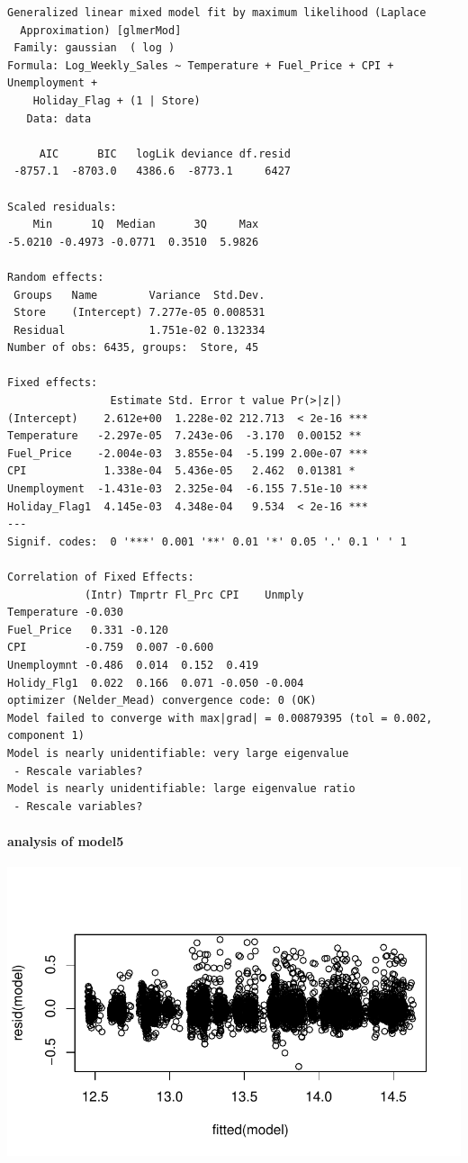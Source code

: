 \documentclass[
  letterpaper,
  DIV=11,
  numbers=noendperiod]{scrartcl}
\let\oldparagraph\paragraph
\renewcommand{\paragraph}[1]{\oldparagraph{#1}\mbox{}}
\begin{document}
\begin{verbatim}
Generalized linear mixed model fit by maximum likelihood (Laplace
  Approximation) [glmerMod]
 Family: gaussian  ( log )
Formula: Log_Weekly_Sales ~ Temperature + Fuel_Price + CPI + Unemployment +  
    Holiday_Flag + (1 | Store)
   Data: data

     AIC      BIC   logLik deviance df.resid 
 -8757.1  -8703.0   4386.6  -8773.1     6427 

Scaled residuals: 
    Min      1Q  Median      3Q     Max 
-5.0210 -0.4973 -0.0771  0.3510  5.9826 

Random effects:
 Groups   Name        Variance  Std.Dev.
 Store    (Intercept) 7.277e-05 0.008531
 Residual             1.751e-02 0.132334
Number of obs: 6435, groups:  Store, 45

Fixed effects:
                Estimate Std. Error t value Pr(>|z|)    
(Intercept)    2.612e+00  1.228e-02 212.713  < 2e-16 ***
Temperature   -2.297e-05  7.243e-06  -3.170  0.00152 ** 
Fuel_Price    -2.004e-03  3.855e-04  -5.199 2.00e-07 ***
CPI            1.338e-04  5.436e-05   2.462  0.01381 *  
Unemployment  -1.431e-03  2.325e-04  -6.155 7.51e-10 ***
Holiday_Flag1  4.145e-03  4.348e-04   9.534  < 2e-16 ***
---
Signif. codes:  0 '***' 0.001 '**' 0.01 '*' 0.05 '.' 0.1 ' ' 1

Correlation of Fixed Effects:
            (Intr) Tmprtr Fl_Prc CPI    Unmply
Temperature -0.030                            
Fuel_Price   0.331 -0.120                     
CPI         -0.759  0.007 -0.600              
Unemploymnt -0.486  0.014  0.152  0.419       
Holidy_Flg1  0.022  0.166  0.071 -0.050 -0.004
optimizer (Nelder_Mead) convergence code: 0 (OK)
Model failed to converge with max|grad| = 0.00879395 (tol = 0.002, component 1)
Model is nearly unidentifiable: very large eigenvalue
 - Rescale variables?
Model is nearly unidentifiable: large eigenvalue ratio
 - Rescale variables?
\end{verbatim}

\hypertarget{analysis-of-model5}{%
\paragraph{analysis of model5}\label{analysis-of-model5}}

\includegraphics{678final_files/figure-pdf/unnamed-chunk-14-1.pdf}
\end{document}
